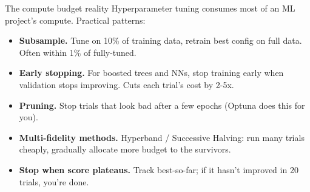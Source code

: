 \documentclass[aspectratio=169]{beamer}
\begin{document}
\begin{frame}{The compute budget reality}
  Hyperparameter tuning consumes most of an ML project's compute. Practical patterns:
  \vfill
  \begin{itemize}
    \item \textbf{Subsample.} Tune on 10\% of training data, retrain best config on full data. Often within 1\% of fully-tuned.
    \item \textbf{Early stopping.} For boosted trees and NNs, stop training early when validation stops improving. Cuts each trial's cost by 2-5x.
    \item \textbf{Pruning.} Stop trials that look bad after a few epochs (Optuna does this for you).
    \item \textbf{Multi-fidelity methods.} Hyperband / Successive Halving: run many trials cheaply, gradually allocate more budget to the survivors.
    \item \textbf{Stop when score plateaus.} Track best-so-far; if it hasn't improved in 20 trials, you're done.
  \end{itemize}
  \vfill
\end{frame}
\end{document}
